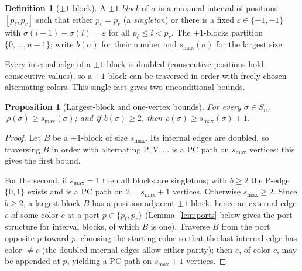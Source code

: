\documentclass[11pt]{article}
\newtheorem{proposition}[theorem]{Proposition}
\theoremstyle{definition}
\newtheorem{definition}[theorem]{Definition}
\newcommand{\smax}{s_{\max}}
\begin{document}


\begin{definition}[$\pm1$-block]\label{def:pmblock}
A \emph{$\pm1$-block} of $\sigma$ is a maximal interval of positions
$[p_\ell,p_r]$ such that either $p_\ell=p_r$ (a \emph{singleton}) or there is a fixed
$\varepsilon\in\{+1,-1\}$ with $\sigma(i+1)-\sigma(i)=\varepsilon$ for all
$p_\ell\le i<p_r$. The $\pm1$-blocks partition $\{0,\dots,n-1\}$; write $b(\sigma)$
for their number and $\smax(\sigma)$ for the largest size.
\end{definition}

Every internal edge of a $\pm1$-block is doubled (consecutive positions hold
consecutive values), so a $\pm1$-block can be traversed in order with freely chosen
alternating colors. This single fact gives two unconditional bounds.

\begin{proposition}[Largest-block and one-vertex bounds]\label{prop:survive}
For every $\sigma\in S_n$, $\ \rho(\sigma)\ge\smax(\sigma)$; and if $b(\sigma)\ge2$,
then $\rho(\sigma)\ge\smax(\sigma)+1$.
\end{proposition}

\begin{proof}
Let $B$ be a $\pm1$-block of size $\smax$. Its internal edges are doubled, so
traversing $B$ in order with alternating $\mathrm P,\mathrm V,\dots$ is a PC path on
$\smax$ vertices: this gives the first bound.

For the second, if $\smax=1$ then all blocks are singletons; with $b\ge2$ the P-edge
$\{0,1\}$ exists and is a PC path on $2=\smax+1$ vertices. Otherwise $\smax\ge2$. Since
$b\ge2$, a largest block $B$ has a position-adjacent $\pm1$-block, hence an external edge $e$ of
some color $c$ at a port $p\in\{p_\ell,p_r\}$ (Lemma~\ref{lem:ports} below gives the
port structure for interval blocks, of which $B$ is one). Traverse $B$ from the port
opposite $p$ toward $p$, choosing the starting color so that the last internal edge has
color $\ne c$ (the doubled internal edges allow either parity); then $e$, of color $c$,
may be appended at $p$, yielding a PC path on $\smax+1$ vertices.
\end{proof}
\end{document}
